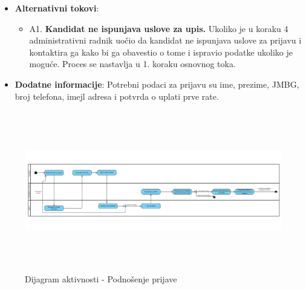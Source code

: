 \begin{itemize}
  \item \textbf{Alternativni tokovi}:
      \begin{itemize}
        \item A1. \textbf{Kandidat ne ispunjava uslove za upis.}
        Ukoliko je u koraku 4 administrativni radnik uočio da kandidat ne ispunjava uslove za prijavu i kontaktira ga kako bi ga obavestio o tome i ispravio podatke ukoliko je moguće. Proces se nastavlja u 1. koraku osnovnog toka.
      \end{itemize}

  \item \textbf{Dodatne informacije}:\newline
  Potrebni podaci za prijavu su ime, prezime, JMBG, broj telefona, imejl adresa i potvrda o uplati prve rate.
\end{itemize}

\begin{figure}[H]
  \begin{center}
      \includegraphics[width=140mm, height=70mm]{Diagrams/dijagram_aktivnosti_podnosenje_prijave.png}
  \end{center}
  \caption {Dijagram aktivnosti - Podnošenje prijave}
  \label{activity_podnosenje_prijave}

\end{figure}



